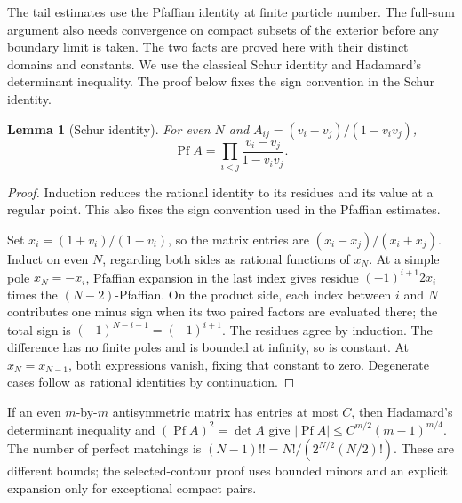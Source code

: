 \documentclass[11pt]{article}
\numberwithin{equation}{section}
\newtheorem{lemma}[theorem]{Lemma}
\theoremstyle{definition}
\newcommand{\Pf}{\operatorname{Pf}}
\begin{document}
The tail estimates use the Pfaffian identity at finite particle number.
The full-sum argument also needs convergence on compact subsets of the
exterior before any boundary limit is taken. The two facts are proved
here with their distinct domains and constants.
We use the classical Schur identity and Hadamard's determinant
inequality. The proof below fixes the sign convention in the Schur
identity.
\begin{lemma}[Schur identity]\label{lem:schur}
For even \(N\) and \(A_{ij}=(v_i-v_j)/(1-v_iv_j)\),
\[
 \Pf A=\prod_{i<j}\frac{v_i-v_j}{1-v_iv_j}.
\]
\end{lemma}
\begin{proof}
Induction reduces the rational identity to its residues and its value at a regular point. This also fixes the sign convention used in the Pfaffian estimates.

Set \(x_i=(1+v_i)/(1-v_i)\), so the matrix entries are
\((x_i-x_j)/(x_i+x_j)\).
Induct on even \(N\), regarding both sides as rational functions of
\(x_N\). At a simple pole \(x_N=-x_i\), Pfaffian expansion in the
last index gives residue
\((-1)^{i+1}2x_i\) times the \((N-2)\)-Pfaffian.
On the product side, each index between \(i\) and \(N\) contributes
one minus sign when its two paired factors are evaluated there;
the total sign is \((-1)^{N-i-1}=(-1)^{i+1}\).
The residues agree by induction. The difference has no finite poles
and is bounded at infinity, so is constant. At \(x_N=x_{N-1}\),
both expressions vanish, fixing that constant to zero.
Degenerate cases follow as rational identities by continuation.
\end{proof}

If an even \(m\)-by-\(m\) antisymmetric matrix has entries at most \(C\),
then Hadamard's determinant inequality and
\((\Pf A)^2=\det A\) give
\(|\Pf A|\le C^{m/2}(m-1)^{m/4}\).
The number of perfect matchings is
\((N-1)!!=N!/(2^{N/2}(N/2)!)\).
These are different bounds; the selected-contour proof uses bounded
minors and an explicit expansion only for exceptional compact pairs.
\end{document}
